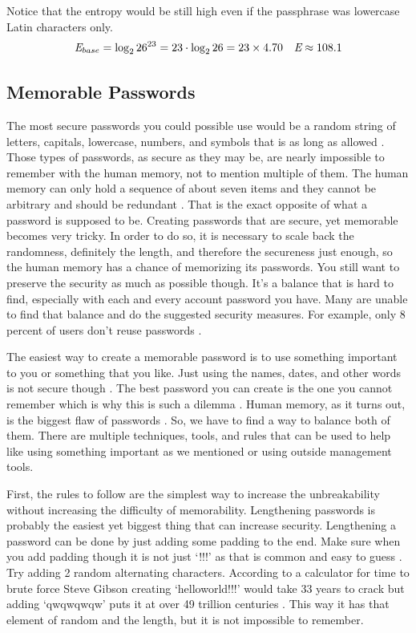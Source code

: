 \documentclass[acmsmall,nonacm]{acmart}
\begin{document}
Notice that the entropy would be still high even if the passphrase was lowercase Latin characters only.
\begin{align*}
    \emph{E}_{base} = \log_2 26^{23} &= 23 \cdot \log_2 26 = 23 \times 4.70 &\emph{E} \approx 108.1
\end{align*}

\subsection{Memorable Passwords}  \label{memorable}

The most secure passwords you could possible use would be a random string of letters, capitals, lowercase, numbers, and symbols that is as long as allowed \cite{lee_2014,nist_2020}. Those types of passwords, as secure as they may be, are nearly impossible to remember with the human memory, not to mention multiple of them. The human memory can only hold a sequence of about seven items and they cannot be arbitrary and should be redundant \cite{yan_2000}. That is the exact opposite of what a password is supposed to be. Creating passwords that are secure, yet memorable becomes very tricky. In order to do so, it is necessary to scale back the randomness, definitely the length, and therefore the secureness just enough, so the human memory has a chance of memorizing its passwords. You still want to preserve the security as much as possible though. It’s a balance that is hard to find, especially with each and every account password you have. Many are unable to find that balance and do the suggested security measures. For example, only 8 percent of users don’t reuse passwords \cite{lee_2014}.

The easiest way to create a memorable password is to use something important to you or something that you like. Just using the names, dates, and other words is not secure though \cite{rubenking_2021}. The best password you can create is the one you cannot remember which is why this is such a dilemma \cite{lee_2014}. Human memory, as it turns out, is the biggest flaw of passwords \cite{yan_2000}. So, we have to find a way to balance both of them. There are multiple techniques, tools, and rules that can be used to help like using something important as we mentioned or using outside management tools.

First, the rules to follow are the simplest way to increase the unbreakability without increasing the difficulty of memorability. Lengthening passwords is probably the easiest yet biggest thing that can increase security. Lengthening a password can be done by just adding some padding to the end. Make sure when you add padding though it is not just ‘!!!’ as that is common and easy to guess \cite{rubenking_2021}. Try adding 2 random alternating characters. According to a calculator for time to brute force Steve Gibson creating ‘helloworld!!!’ would take 33 years to crack but adding ‘qwqwqwqw’ puts it at over 49 trillion centuries \cite{rubenking_2021}. This way it has that element of random and the length, but it is not impossible to remember.
\end{document}
